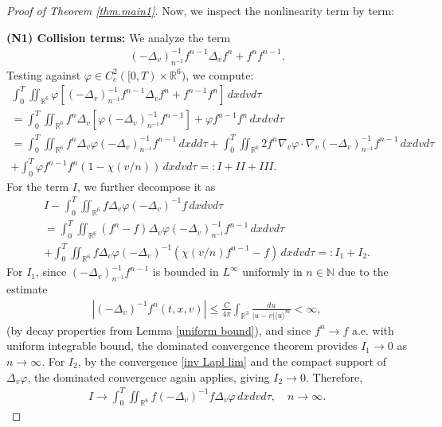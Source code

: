 \documentclass[reqno,11pt,final]{amsart}
\theoremstyle{plain}
\numberwithin{equation}{section}
\numberwithin{theorem}{section}
\begin{document}
\begin{proof}[Proof of Theorem \ref{thm.main1}]
Now, we inspect the nonlinearity term by term: 

\noindent\textbf{(N1) Collision terms: }We analyze the term 
\begin{align*}
(-\Delta_v)_{n^{-1}}^{-1}f^{n-1}\Delta_vf^n + f^n f^{n-1}.
\end{align*}Testing against $\varphi\in C_c^2([0,T)\times\mathbb{R}^6)$, we compute:
\begin{multline*}
\int_0^T\iint_{\mathbb{R}^6} \varphi[(-\Delta_v)_{n^{-1}}^{-1}f^{n-1}\Delta_vf^n + f^{n-1}f^n]\,dxdvd\tau\\
= \int_0^T\iint_{\mathbb{R}^6} f^n \Delta_v[\varphi(-\Delta_v)_{n^{-1}}^{-1}f^{n-1}] + \varphi f^{n-1}f^n \,dxdvd\tau\\
= \int_0^T\iint_{\mathbb{R}^6} f^n \Delta_v\varphi(-\Delta_v)_{n^{-1}}^{-1}f^{n-1} \,dxdd\tau
+ \int_0^T\iint_{\mathbb{R}^6}2f^n\nabla_v\varphi\cdot\nabla_v(-\Delta_v)_{n^{-1}}^{-1}f^{n-1}\,dxdvd\tau \\
+\int_0^T \varphi f^{n-1}f^n(1-\chi(v/n))\,dxdvd\tau=: I + II + III.
\end{multline*}For the term $I$, we further decompose it as 
\begin{multline*}
I - \int_0^T\iint_{\mathbb{R}^6} f\Delta_v\varphi(-\Delta_v)^{-1}f\,dxdvd\tau\\
= \int_0^T\iint_{\mathbb{R}^6} (f^n - f)\Delta_v\varphi(-\Delta_v)_{n^{-1}}^{-1}f^{n-1}\,dxdvd\tau \\
+ \int_0^T \iint_{\mathbb{R}^6} f\Delta_v\varphi(-\Delta_v)^{-1}(\chi(v/n)f^{n-1} - f)\,dxdvd\tau =: I_1 + I_2.
\end{multline*}For $I_1$, since $(-\Delta_v)_{n^{-1}}^{-1}f^{n-1}$ is bounded in $L^\infty$ uniformly in $n\in\mathbb{N}$ due to the estimate
\begin{align*}
|(-\Delta_v)^{-1}f^n(t,x,v)| \le \frac{C}{4\pi} \int_{\mathbb{R}^3} \frac{du}{|u-v|\langle u\rangle^{m}}<\infty,
\end{align*}(by decay properties from Lemma \ref{uniform bound}), and since $f^n \to f$ a.e. with uniform integrable bound, the dominated convergence theorem provides $I_1 \to 0$ as $n\to\infty$. For $I_2$, by the convergence \eqref{inv Lapl lim} and the compact support of $\Delta_v\varphi$, the dominated convergence again applies, giving $I_2\to0$. Therefore,
\begin{align}\label{Colls1 limit}
I \to \int_0^T \iint_{\mathbb{R}^6} f(-\Delta_v)^{-1}f\Delta_v\varphi\,dxdvd\tau, \quad n\to\infty.
\end{align}


\end{proof}
\end{document}
